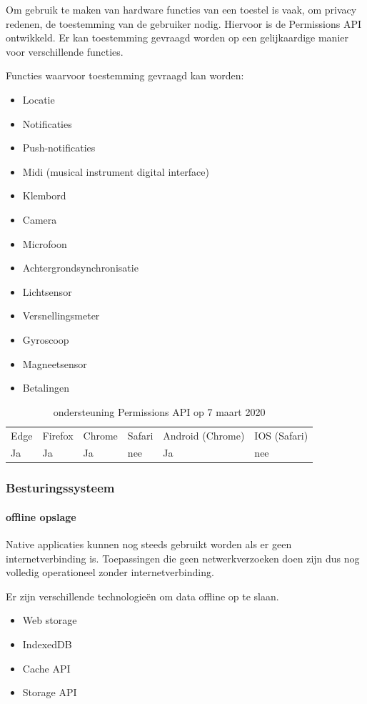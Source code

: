 Om gebruik te maken van hardware functies van een toestel is vaak, om privacy redenen, de toestemming van de gebruiker nodig. Hiervoor is de Permissions API \autocite{Caceres2017} ontwikkeld. Er kan toestemming gevraagd worden op een gelijkaardige manier voor verschillende functies.

Functies waarvoor toestemming gevraagd kan worden:
 \begin{itemize}
	\item	Locatie
	\item	Notificaties
	\item	Push-notificaties
	\item	Midi (musical instrument digital interface)
	\item	Klembord
	\item	Camera
	\item	Microfoon
	\item	Achtergrondsynchronisatie
	\item	Lichtsensor
	\item	Versnellingsmeter
	\item	Gyroscoop
	\item	Magneetsensor
	\item	Betalingen
\end{itemize}

	\begin{table}[H]
		\centering
		\begin{tabular}{llllll}
			Edge & Firefox & Chrome & Safari & Android (Chrome) & IOS (Safari) \\
			Ja   & Ja      &  Ja     & nee     & Ja               & nee          
		\end{tabular}	
		\caption{ondersteuning Permissions API op 7 maart 2020}
	\end{table}
	

\subsubsection{Besturingssysteem}
\paragraph{offline opslage}
Native applicaties kunnen nog steeds gebruikt worden als er geen internetverbinding is. Toepassingen die geen netwerkverzoeken doen zijn dus nog volledig operationeel zonder internetverbinding. 

Er zijn verschillende technologieën om data offline op te slaan. 

 \begin{itemize}
	\item	Web storage
	\item	IndexedDB
	\item	Cache API
	\item	Storage API
\end{itemize}

